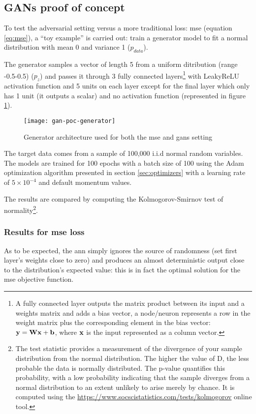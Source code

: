 \documentclass[../main.tex]{subfiles}
\begin{document}
\subsection{GANs proof of concept}
To test the adversarial setting versus a more traditional loss: \gls{mse}
(equation \ref{eq:mse}),
a ``toy example'' is carried out\footnotemark: train a generator
model to fit a normal distribution with mean 0 and variance 1 ($p_{data}$).

The generator samples a vector of length 5
from a uniform ditribution (range -0.5-0.5) ($p_z$) and passes
it through 3 fully connected layers\footnote{A fully connected layer outputs
the matrix product between its input and a weights matrix and adds a bias vector,
a node/neuron represents a row in the weight matrix plus the corresponding
element in the bias vector: $\mathbf{y} = \mathbf{W}\mathbf{x} + \mathbf{b}$, where
$\mathbf{x}$ is the input represented as a column vector.}
with LeakyReLU activation function and 5 units on each layer except for the
final layer which only has 1 unit (it outputs a scalar) and no activation
function (represented in figure \ref{fig:gan-poc-generator}).

\begin{figure}[h]
\centering
\texttt{[image: gan-poc-generator]}
\caption{Generator architecture used for both the \gls{mse} and \gls{gans}
setting}
\label{fig:gan-poc-generator}
\end{figure}

The target data comes from a sample of 100,000 i.i.d normal random
variables.  The models are trained for 100 epochs with a batch size of 100
using the Adam optimization algorithm presented in section \ref{sec:optimizers}
with a learning rate of $5 \times 10^{-4}$ and default momentum values.

The results are compared by computing the Kolmogorov-Smirnov test of
normality\footnote{The test statistic provides a measurement of the divergence
of your sample distribution from the normal distribution.
The higher the value of D, the less probable  the data is normally distributed.
The p-value quantifies this probability, with a low probability indicating that
the sample diverges from a normal distribution to an extent unlikely to arise
merely by chance.  It is computed
using the \url{https://www.socscistatistics.com/tests/kolmogorov} online tool.}.

\subsubsection{Results for \gls{mse} loss}
As to be expected, the \gls{ann} simply ignores the source of randomness
(set first layer's weights close to zero) and produces an almost deterministic
output close to the distribution's expected value: this is in fact the optimal
solution for the \gls{mse} objective function.
\end{document}
